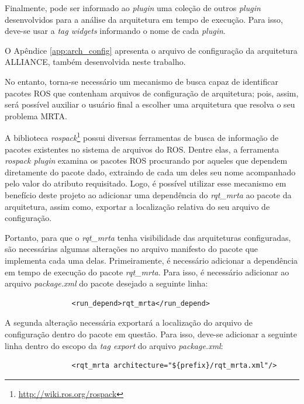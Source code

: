             Finalmente, pode ser informado ao \textit{plugin} uma coleção de outros \textit{plugin} desenvolvidos para a análise da arquitetura em tempo de execução. Para isso, deve-se usar a \textit{tag widgets} informando o nome de cada \textit{plugin}.
            
            O Apêndice \ref{app:arch_config} apresenta o arquivo de configuração da arquitetura ALLIANCE, também desenvolvida neste trabalho.
            
            No entanto, torna-se necessário um mecanismo de busca capaz de identificar pacotes ROS que contenham arquivos de configuração de arquitetura; pois, assim, será possível auxiliar o usuário final a escolher uma arquitetura que resolva o seu problema MRTA.
            
            A biblioteca \textit{rospack}\footnote{\url{http://wiki.ros.org/rospack}} possui diversas ferramentas de busca de informação de pacotes existentes no sistema de arquivos do ROS. Dentre elas, a ferramenta \textit{rospack plugin} examina os pacotes ROS procurando por aqueles que dependem diretamente do pacote dado, extraindo de cada um deles seu nome acompanhado pelo valor do atributo requisitado. Logo, é possível utilizar esse mecanismo em benefício deste projeto ao adicionar uma dependência do \textit{rqt\_mrta} ao pacote da arquitetura, assim como, exportar a localização relativa do seu arquivo de configuração. 
            
            Portanto, para que o \textit{rqt\_mrta} tenha visibilidade das arquiteturas configuradas, são necessárias algumas alterações no arquivo manifesto do pacote que implementa cada uma delas. Primeiramente, é necessário adicionar a dependência em tempo de execução do pacote \textit{rqt\_mrta}. Para isso, é necessário adicionar ao arquivo \textit{package.xml} do pacote desejado a seguinte linha:
            
            \begin{lstlisting}
                <run_depend>rqt_mrta</run_depend>
            \end{lstlisting}
            
            A segunda alteração necessária exportará a localização do arquivo de configuração dentro do pacote em questão. Para isso, deve-se adicionar a seguinte linha dentro do escopo da \textit{tag export} do arquivo \textit{package.xml}:
            
            \begin{lstlisting}
                <rqt_mrta architecture="${prefix}/rqt_mrta.xml"/>
            \end{lstlisting}
            
